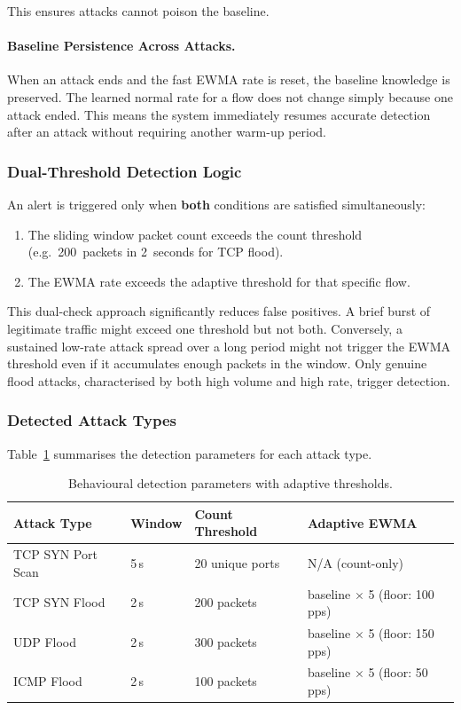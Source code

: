 \documentclass[12pt,a4paper]{article}
\begin{document}
This ensures attacks cannot poison the baseline.

\paragraph{Baseline Persistence Across Attacks.}
When an attack ends and the fast EWMA rate is reset, the baseline knowledge is preserved. The learned normal rate for a flow does not change simply because one attack ended. This means the system immediately resumes accurate detection after an attack without requiring another warm-up period.

\subsubsection{Dual-Threshold Detection Logic}

An alert is triggered only when \textbf{both} conditions are satisfied simultaneously:
\begin{enumerate}
    \item The sliding window packet count exceeds the count threshold (e.g.\ 200~packets in 2~seconds for TCP flood).
    \item The EWMA rate exceeds the adaptive threshold for that specific flow.
\end{enumerate}

This dual-check approach significantly reduces false positives. A brief burst of legitimate traffic might exceed one threshold but not both. Conversely, a sustained low-rate attack spread over a long period might not trigger the EWMA threshold even if it accumulates enough packets in the window. Only genuine flood attacks, characterised by both high volume and high rate, trigger detection.

\subsubsection{Detected Attack Types}

Table~\ref{tab:thresholds} summarises the detection parameters for each attack type.

\begin{table}[H]
\centering
\caption{Behavioural detection parameters with adaptive thresholds.}
\label{tab:thresholds}
\begin{tabular}{lllp{4.5cm}}
\toprule
\textbf{Attack Type} & \textbf{Window} & \textbf{Count Threshold} & \textbf{Adaptive EWMA} \\
\midrule
TCP SYN Port Scan & 5\,s & 20 unique ports   & N/A (count-only) \\
TCP SYN Flood     & 2\,s & 200 packets       & baseline $\times$ 5 (floor: 100\,pps) \\
UDP Flood         & 2\,s & 300 packets       & baseline $\times$ 5 (floor: 150\,pps) \\
ICMP Flood        & 2\,s & 100 packets       & baseline $\times$ 5 (floor: 50\,pps) \\
\bottomrule
\end{tabular}
\end{table}
\end{document}
